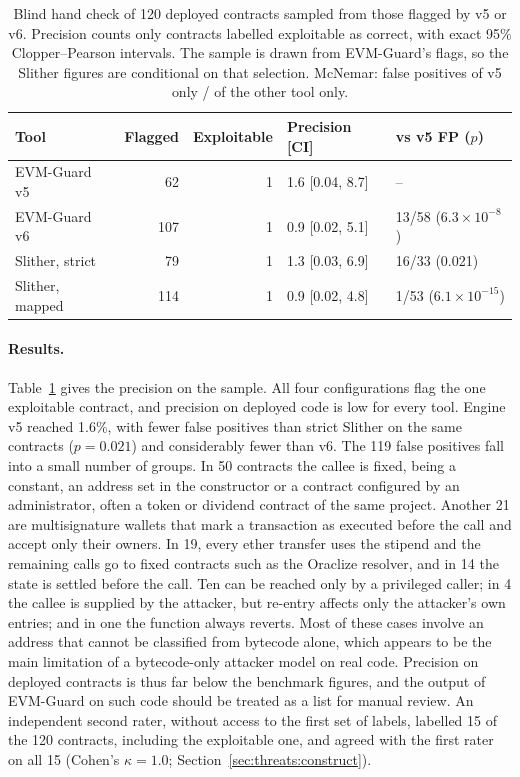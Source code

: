 \documentclass[pdflatex,sn-mathphys]{sn-jnl}
\theoremstyle{thmstyletwo}
\theoremstyle{thmstyletwo}
\begin{document}
\begin{table}[t]
\centering
\small
\caption{Blind hand check of 120 deployed contracts sampled from those flagged by v5 or v6. Precision counts only contracts labelled exploitable as correct, with exact 95\% Clopper--Pearson intervals. The sample is drawn from EVM-Guard's flags, so the Slither figures are conditional on that selection. McNemar: false positives of v5 only / of the other tool only.}
\label{tab:mainnet_sample}
\begin{tabular}{@{}lrrll@{}}
\toprule
\textbf{Tool} & \textbf{Flagged} & \textbf{Exploitable} & \textbf{Precision [CI]} & \textbf{vs v5 FP ($p$)} \\
\midrule
EVM-Guard v5 & 62 & 1 & 1.6 [0.04, 8.7] & -- \\
EVM-Guard v6 & 107 & 1 & 0.9 [0.02, 5.1] & 13/58 ($6.3 \times 10^{-8}$) \\
Slither, strict & 79 & 1 & 1.3 [0.03, 6.9] & 16/33 (0.021) \\
Slither, mapped & 114 & 1 & 0.9 [0.02, 4.8] & 1/53 ($6.1 \times 10^{-15}$) \\
\bottomrule
\end{tabular}
\end{table}

\paragraph{Results.} Table~\ref{tab:mainnet_sample} gives the precision on the sample. All four configurations flag the one exploitable contract, and precision on deployed code is low for every tool. Engine v5 reached 1.6\%, with fewer false positives than strict Slither on the same contracts ($p = 0.021$) and considerably fewer than v6. The 119 false positives fall into a small number of groups. In 50 contracts the callee is fixed, being a constant, an address set in the constructor or a contract configured by an administrator, often a token or dividend contract of the same project. Another 21 are multisignature wallets that mark a transaction as executed before the call and accept only their owners. In 19, every ether transfer uses the stipend and the remaining calls go to fixed contracts such as the Oraclize resolver, and in 14 the state is settled before the call. Ten can be reached only by a privileged caller; in 4 the callee is supplied by the attacker, but re-entry affects only the attacker's own entries; and in one the function always reverts. Most of these cases involve an address that cannot be classified from bytecode alone, which appears to be the main limitation of a bytecode-only attacker model on real code. Precision on deployed contracts is thus far below the benchmark figures, and the output of EVM-Guard on such code should be treated as a list for manual review. An independent second rater, without access to the first set of labels, labelled 15 of the 120 contracts, including the exploitable one, and agreed with the first rater on all 15 (Cohen's $\kappa = 1.0$; Section~\ref{sec:threats:construct}).
\end{document}

